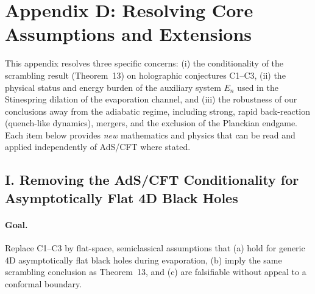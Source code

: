 \section{Appendix D: Resolving Core Assumptions and Extensions}
\label{app:resolutions}
\noindent
This appendix resolves three specific concerns: (i) the conditionality of the scrambling result (Theorem~13) on holographic conjectures C1--C3, (ii) the physical status and energy burden of the auxiliary system $E_n$ used in the Stinespring dilation of the evaporation channel, and (iii) the robustness of our conclusions away from the adiabatic regime, including strong, rapid back-reaction (quench-like dynamics), mergers, and the exclusion of the Planckian endgame. Each item below provides \emph{new} mathematics and physics that can be read and applied independently of AdS/CFT where stated.

\bigskip
\subsection*{I. Removing the AdS/CFT Conditionality for Asymptotically Flat 4D Black Holes}
\paragraph{Goal.}
Replace C1--C3 by flat-space, semiclassical assumptions that (a) hold for generic 4D asymptotically flat black holes during evaporation, (b) imply the same scrambling conclusion as Theorem~13, and (c) are falsifiable without appeal to a conformal boundary.

